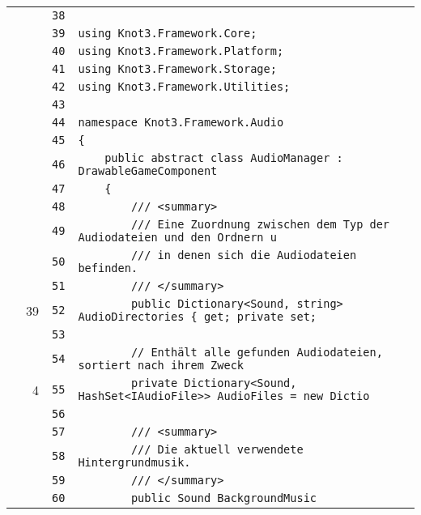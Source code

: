 \documentclass[a4paper,10pt]{article}
\begin{document}
\begin{longtable}[l]{lrrl}
\cellcolor{gray} &  & \verb~38~ & \verb~~\\
\cellcolor{gray} &  & \verb~39~ & \verb~using Knot3.Framework.Core;~\\
\cellcolor{gray} &  & \verb~40~ & \verb~using Knot3.Framework.Platform;~\\
\cellcolor{gray} &  & \verb~41~ & \verb~using Knot3.Framework.Storage;~\\
\cellcolor{gray} &  & \verb~42~ & \verb~using Knot3.Framework.Utilities;~\\
\cellcolor{gray} &  & \verb~43~ & \verb~~\\
\cellcolor{gray} &  & \verb~44~ & \verb~namespace Knot3.Framework.Audio~\\
\cellcolor{gray} &  & \verb~45~ & \verb~{~\\
\cellcolor{gray} &  & \verb~46~ & \verb~    public abstract class AudioManager : DrawableGameComponent~\\
\cellcolor{gray} &  & \verb~47~ & \verb~    {~\\
\cellcolor{gray} &  & \verb~48~ & \verb~        /// <summary>~\\
\cellcolor{gray} &  & \verb~49~ & \verb~        /// Eine Zuordnung zwischen dem Typ der Audiodateien und den Ordnern u~\\
\cellcolor{gray} &  & \verb~50~ & \verb~        /// in denen sich die Audiodateien befinden.~\\
\cellcolor{gray} &  & \verb~51~ & \verb~        /// </summary>~\\
\cellcolor{green} & 39 & \verb~52~ & \verb~        public Dictionary<Sound, string> AudioDirectories { get; private set; ~\\
\cellcolor{gray} &  & \verb~53~ & \verb~~\\
\cellcolor{gray} &  & \verb~54~ & \verb~        // Enthält alle gefunden Audiodateien, sortiert nach ihrem Zweck~\\
\cellcolor{green} & 4 & \verb~55~ & \verb~        private Dictionary<Sound, HashSet<IAudioFile>> AudioFiles = new Dictio~\\
\cellcolor{gray} &  & \verb~56~ & \verb~~\\
\cellcolor{gray} &  & \verb~57~ & \verb~        /// <summary>~\\
\cellcolor{gray} &  & \verb~58~ & \verb~        /// Die aktuell verwendete Hintergrundmusik.~\\
\cellcolor{gray} &  & \verb~59~ & \verb~        /// </summary>~\\
\cellcolor{gray} &  & \verb~60~ & \verb~        public Sound BackgroundMusic~\\

\end{longtable}
\end{document}
